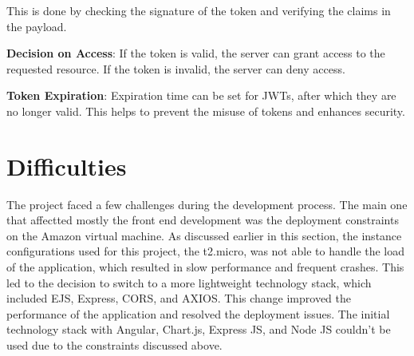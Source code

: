 This is done by checking the signature of the token and verifying the claims in the payload.

\textbf{Decision on Access}: If the token is valid, the server can grant access to the requested resource. If the token is invalid, the server can deny access.

\textbf{Token Expiration}: Expiration time can be set for JWTs, after which they are no longer valid. This helps to prevent the misuse of tokens and enhances security.


\section{Difficulties}

The project faced a few challenges during the development process. The main one that affectted mostly the front end development was the deployment constraints 
on the Amazon virtual machine. As discussed earlier in this section, the instance configurations used for this project, the t2.micro, was not able to handle the
load of the application, which resulted in slow performance and frequent crashes. This led to the decision to switch to a more lightweight technology stack,
which included EJS, Express, CORS, and AXIOS. This change improved the performance of the application and resolved the deployment issues.
The initial technology stack with Angular, Chart.js, Express JS, and Node JS couldn't be used due to the constraints discussed above.
